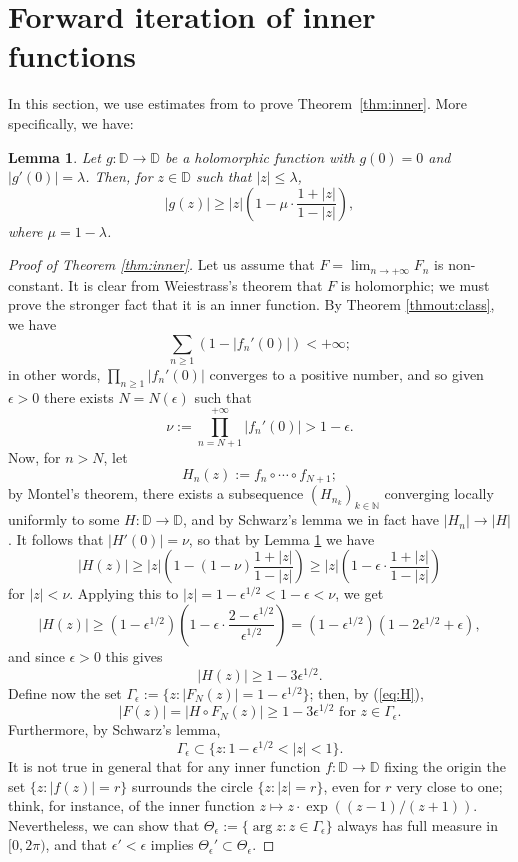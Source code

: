 \documentclass[a4paper,11pt]{article}
\theoremstyle{plain}
\newtheorem{lemma}{Lemma}[section]
\theoremstyle{definition}
\theoremstyle{definition}
\def\D{\mathbb{D}}
\begin{document}
\section{Forward iteration of inner functions} \label{sec:inner}
In this section, we use estimates from \cite[Corollary 2.4 and Theorem 2.5]{BEFRS19} to prove Theorem~\ref{thm:inner}. More specifically, we have:
\begin{lemma} \label{lem:estimates}
Let $g:\D\to\D$ be a holomorphic function with $g(0) = 0$ and $|g'(0)| = \lambda$. Then, for $z\in\D$ such that $|z| \leq \lambda$,
\[ |g(z)| \geq |z|\left(1 - \mu\cdot\frac{1 + |z|}{1 - |z|}\right), \]
where $\mu = 1 - \lambda$.
\end{lemma}
\begin{proof}[Proof of Theorem \ref{thm:inner}]
Let us assume that $F = \lim_{n\to +\infty} F_n$ is non-constant. It is clear from Weiestrass's theorem that $F$ is holomorphic; we must prove the stronger fact that it is an inner function. By Theorem \ref{thmout:class}, we have
\[ \sum_{n\geq 1} (1 - |f_n'(0)|) < +\infty; \]
in other words, $\prod_{n\geq 1} |f_n'(0)|$ converges to a positive number, and so given $\epsilon > 0$ there exists $N = N(\epsilon)$ such that
\[ \nu := \prod_{n=N+1}^{+\infty} |f_n'(0)| > 1 - \epsilon. \]
Now, for $n > N$, let
\[ H_n(z) := f_n\circ\cdots\circ f_{N+1}; \]
by Montel's theorem, there exists a subsequence $(H_{n_k})_{k\in\mathbb{N}}$ converging locally uniformly to some $H:\D\to\D$, and by Schwarz's lemma we in fact have $|H_n|\to |H|$. It follows that $|H'(0)| = \nu$, so that by Lemma \ref{lem:estimates} we have
\[ |H(z)| \geq |z|\left(1 - (1 - \nu)\frac{1 + |z|}{1 - |z|}\right) \geq |z|\left(1 - \epsilon\cdot\frac{1 + |z|}{1 - |z|}\right) \]
for $|z| < \nu$. Applying this to $|z| = 1 - \epsilon^{1/2} < 1 - \epsilon < \nu$, we get
\[ |H(z)| \geq (1 - \epsilon^{1/2})\left(1 - \epsilon\cdot\frac{2 - \epsilon^{1/2}}{\epsilon^{1/2}}\right) = (1 - \epsilon^{1/2})(1 - 2\epsilon^{1/2} + \epsilon), \]
and since $\epsilon > 0$ this gives
\begin{equation} \label{eq:H}
    |H(z)| \geq 1 - 3\epsilon^{1/2}.
\end{equation}
Define now the set $\Gamma_\epsilon := \{z : |F_N(z)| = 1 - \epsilon^{1/2}\}$; then, by (\ref{eq:H}),
\begin{equation} \label{eq:HGN}
    \text{$|F(z)| = |H\circ F_N(z)| \geq 1 - 3\epsilon^{1/2}$ for $z\in \Gamma_\epsilon$.}
\end{equation}
Furthermore, by Schwarz's lemma,
\begin{equation} \label{eq:Ge}
    \Gamma_\epsilon \subset \{z : 1 - \epsilon^{1/2} < |z| < 1\}.
\end{equation}
It is not true in general that for any inner function $f:\D\to\D$ fixing the origin the set $\{z : |f(z)| = r\}$ surrounds the circle $\{z : |z| = r\}$, even for $r$ very close to one; think, for instance, of the inner function $z\mapsto z\cdot\exp\left((z - 1)/(z + 1)\right)$. Nevertheless, we can show that $\Theta_\epsilon := \{\arg z : z\in\Gamma_\epsilon\}$ always has full measure in $[0, 2\pi)$, and that $\epsilon' < \epsilon$ implies $\Theta_\epsilon'\subset \Theta_\epsilon$.


\end{proof}
\end{document}
